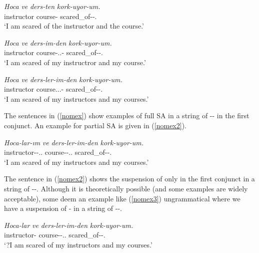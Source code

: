 \begin{exe}
    \ex \label{nomex} 
    \begin{xlist}
        \ex 
        \gll 
        \textit{Hoca} \textit{ve} \textit{ders-ten} \textit{kork-uyor-um.} \\ instructor {\And} course-{\Abl} scared\_of-{\Prog}-{\First}.{\Sg} \\
        \glt `I am scared of the instructor and the course.'
        
        \ex
        \gll 
        \textit{Hoca} \textit{ve} \textit{ders-im-den} \textit{kork-uyor-um.} \\ instructor {\And} course-{\Poss}.{\First}.{\Sg}-{\Abl} scared\_of-{\Prog}-{\First}.{\Sg} \\
        \glt `I am scared of my instructror and my course.' 
        
        \ex 
        \gll 
        \textit{Hoca} \textit{ve} \textit{ders-ler-im-den} \textit{kork-uyor-um.} \\ instructor {\And} course.{\Poss}.{\First}.{\Sg}-{\Abl} scared\_of-{\Prog}-{\First}.{\Sg} \\
        \glt `I am scared of my instructors and my courses.'
    \end{xlist}
\end{exe}
The sentences in (\ref{nomex}) show examples of full SA in a string of {\Pl}-{\Poss}-{\Case} in the first conjunct. An example for partial SA is given in (\ref{nomex2}).

\begin{exe}
    \ex \label{nomex2}
    \gll
    \textit{Hoca-lar-ım} \textit{ve} \textit{ders-ler-im-den} \textit{kork-uyor-um.} \\ instructor-{\Pl}-{\Poss}.{\First}.{\Sg} {\And} course-{\Pl}-{\Poss}.{\First}.{\Sg} scared\_of-{\Prog}-{\First}.{\Sg} \\
    \glt `I am scared of my instructors and my courses.'
\end{exe}
The sentence in (\ref{nomex2}) shows the suspension of only {\Case} in the first conjunct in a string of {\Pl}-{\Poss}-{\Case}. Although it is theoretically possible (and some examples are widely acceptable), some deem an example like (\ref{nomex3}) ungrammatical where we have a suspension of {\Poss}-{\Case} in a string of {\Pl}-{\Poss}-{\Case}.

\begin{exe}
    \ex \label{nomex3}
    \gll 
    \textit{Hoca-lar} \textit{ve} \textit{ders-ler-im-den} \textit{kork-uyor-um.} \\ instructor-{\Pl} {\And} course-{\Pl}-{\Poss}.{\First}.{\Sg} scared\_of-{\Prog}-{\First}.{\Sg} \\
    \glt `?I am scared of my instructors and my courses.'
\end{exe}

